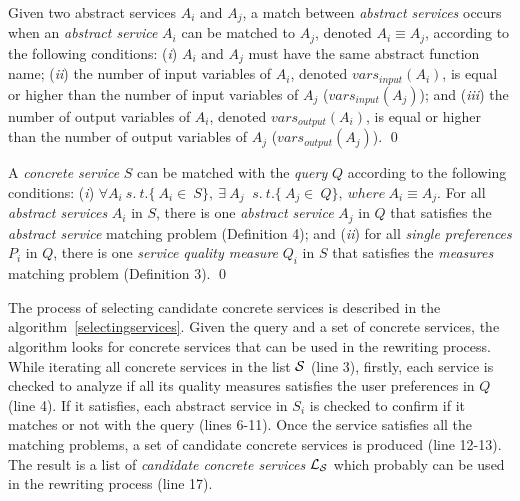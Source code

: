 \begin{definition}
Given two abstract services $A_{i}$ and $A_{j}$, a match between \textit{abstract services} occurs when an \textit{abstract service} $A_{i}$ can be matched to $A_{j}$, denoted $A_{i} \equiv A_{j}$, according to the following conditions: 
(\textit{i}) $A_{i}$ and $A_{j}$ must have the same abstract function name; 
(\textit{ii}) the number of input variables of $A_{i}$, denoted $vars_{input}(A_{i})$, is equal or higher than the number of input variables of $A_{j}$ ($vars_{input}(A_{j})$); and 
(\textit{iii}) the number of output variables of $A_{i}$, denoted $vars_{output}(A_{i})$, is equal or higher than the number of output variables of $A_{j}$ ($vars_{output}(A_{j})$).
\qed
\end{definition}

\begin{definition}
A \textit{concrete service} $S$ can be matched with the \textit{query} $Q$ according to the following conditions:
(\textit{i}) $\forall A_{i}  \ s. \ t. \lbrace\ A_{i} \in \ S\rbrace, \ \exists \ A_{j} \ $ $s. \ t. \lbrace\ A_{j} \in \ Q\rbrace, \ where \ A_{i} \equiv A_{j}.$ For all \textit{abstract services} $A_{i}$ in $S$, there is one \textit{abstract service} $A_{j}$ in $Q$ that satisfies the \textit{abstract service} matching problem (Definition 4); and (\textit{ii}) for all \textit{single preferences} $P_{i}$ in $Q$, there is one
\textit{service quality measure} $Q_{i}$ in $S$ that satisfies the \textit{measures} matching problem (Definition 3).
\qed
\end{definition}


The process of selecting candidate concrete services
is described in the algorithm~\ref{selectingservices}.
Given the query and a set of concrete services, the algorithm
looks for concrete services that can be used in the rewriting process.
While iterating all concrete services in the list $\hbox{${\cal S}$}$ (line 3), firstly,
each service is checked to analyze if all its quality measures satisfies the user preferences
in $Q$ (line 4). If it satisfies, each abstract service in $S_{i}$ is checked to confirm if 
it matches or not with the query (lines 6-11). Once the service satisfies all the matching 
problems, a set of candidate concrete services is produced (line 12-13). The result
is a list of \textit{candidate concrete services} $\hbox{${\cal L_{S}}$}$ which
probably can be used in the rewriting process (line 17).


